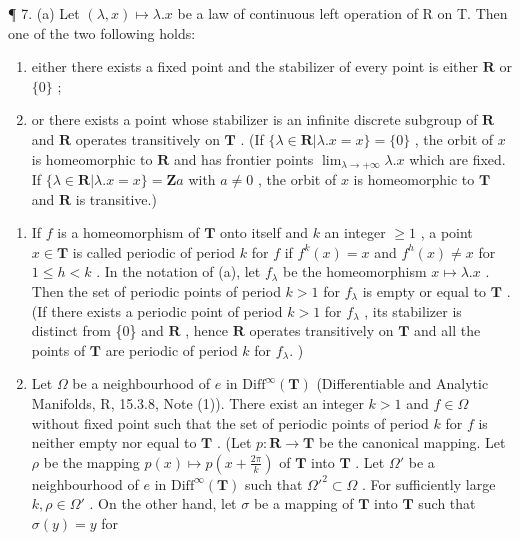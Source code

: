 ¶ 7. (a) Let \((\lambda, x) \mapsto \lambda.x\) be a law of continuous left operation of R on T. Then one of the two following holds:

\begin{enumerate}
\def\labelenumi{(\arabic{enumi})}
\item
  either there exists a fixed point and the stabilizer of every point is either \(\mathbf{R}\) or \(\{0\}\) ;
\item
  or there exists a point whose stabilizer is an infinite discrete subgroup of \(\mathbf{R}\) and \(\mathbf{R}\) operates transitively on \(\mathbf{T}\) . (If \(\{\lambda \in \mathbf{R}|\lambda .x = x\} = \{0\}\) , the orbit of \(x\) is homeomorphic to \(\mathbf{R}\) and has frontier points \(\lim_{\lambda \to +\infty}\lambda .x\) which are fixed. If \(\{\lambda \in \mathbf{R}|\lambda .x = x\} = \mathbf{Z}a\) with \(a\neq 0\) , the orbit of \(x\) is homeomorphic to \(\mathbf{T}\) and \(\mathbf{R}\) is transitive.)
\end{enumerate}

\begin{enumerate}
\def\labelenumi{(\alph{enumi})}
\setcounter{enumi}{1}
\item
  If \(f\) is a homeomorphism of \(\mathbf{T}\) onto itself and \(k\) an integer \(\geqslant 1\) , a point \(x \in \mathbf{T}\) is called periodic of period \(k\) for \(f\) if \(f^k(x) = x\) and \(f^h(x) \neq x\) for \(1 \leqslant h < k\) . In the notation of (a), let \(f_{\lambda}\) be the homeomorphism \(x \mapsto \lambda .x\) . Then the set of periodic points of period \(k > 1\) for \(f_{\lambda}\) is empty or equal to \(\mathbf{T}\) . (If there exists a periodic point of period \(k > 1\) for \(f_{\lambda}\) , its stabilizer is distinct from \{0\} and \(\mathbf{R}\) , hence \(\mathbf{R}\) operates transitively on \(\mathbf{T}\) and all the points of \(\mathbf{T}\) are periodic of period \(k\) for \(f_{\lambda}.\) )
\item
  Let \(\Omega\) be a neighbourhood of \(e\) in \(\mathrm{Diff}^{\infty}(\mathbf{T})\) (Differentiable and Analytic Manifolds, R, 15.3.8, Note (1)). There exist an integer \(k > 1\) and \(f\in \Omega\) without fixed point such that the set of periodic points of period \(k\) for \(f\) is neither empty nor equal to \(\mathbf{T}\) . (Let \(p\colon \mathbf{R}\to \mathbf{T}\) be the canonical mapping. Let \(\rho\) be the mapping \(p(x) \mapsto p\left(x + \frac{2\pi}{k}\right)\) of \(\mathbf{T}\) into \(\mathbf{T}\) . Let \(\Omega'\) be a neighbourhood of \(e\) in \(\text{Diff}^\infty(\mathbf{T})\) such that \(\Omega'^2 \subset \Omega\) . For sufficiently large \(k, \rho \in \Omega'\) . On the other hand, let \(\sigma\) be a mapping of \(\mathbf{T}\) into \(\mathbf{T}\) such that \(\sigma(y) = y\) for
\end{enumerate}

